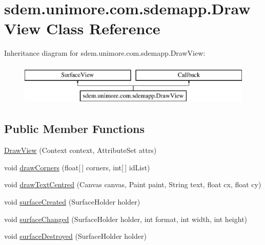 \hypertarget{classsdem_1_1unimore_1_1com_1_1sdemapp_1_1_draw_view}{\section{sdem.\+unimore.\+com.\+sdemapp.\+Draw\+View Class Reference}
\label{classsdem_1_1unimore_1_1com_1_1sdemapp_1_1_draw_view}
}
Inheritance diagram for sdem.\+unimore.\+com.\+sdemapp.\+Draw\+View\+:\begin{figure}[H]
\begin{center}
\leavevmode
\includegraphics[height=2.000000cm]{classsdem_1_1unimore_1_1com_1_1sdemapp_1_1_draw_view}
\end{center}
\end{figure}
\subsection*{Public Member Functions}
\begin{DoxyCompactItemize}
\item 
\hyperlink{classsdem_1_1unimore_1_1com_1_1sdemapp_1_1_draw_view_a0f33e842727aa93495a965aa58757cf6}{Draw\+View} (Context context, Attribute\+Set attrs)
\item 
void \hyperlink{classsdem_1_1unimore_1_1com_1_1sdemapp_1_1_draw_view_aae745ca136fcbfcac69ebdaa4d106711}{draw\+Corners} (float\mbox{[}$\,$\mbox{]} corners, int\mbox{[}$\,$\mbox{]} id\+List)
\item 
void \hyperlink{classsdem_1_1unimore_1_1com_1_1sdemapp_1_1_draw_view_a5a538e420c4205dc2db79429f9de17f0}{draw\+Text\+Centred} (Canvas canvas, Paint paint, String text, float cx, float cy)
\item 
void \hyperlink{classsdem_1_1unimore_1_1com_1_1sdemapp_1_1_draw_view_adac404d58277c2e02759e52a007ff2f2}{surface\+Created} (Surface\+Holder holder)
\item 
void \hyperlink{classsdem_1_1unimore_1_1com_1_1sdemapp_1_1_draw_view_ac654c04ec20230794d1f7d4205ff6ccc}{surface\+Changed} (Surface\+Holder holder, int format, int width, int height)
\item 
void \hyperlink{classsdem_1_1unimore_1_1com_1_1sdemapp_1_1_draw_view_ada0d09df8995e1a3b2356d3d99d79808}{surface\+Destroyed} (Surface\+Holder holder)
\end{DoxyCompactItemize}

